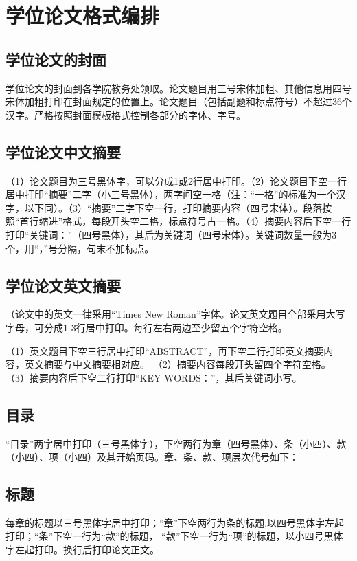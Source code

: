 \documentclass{bucthesis}
\begin{document}
\chapter{学位论文格式编排}
\section{学位论文的封面}{\par
	学位论文的封面到各学院教务处领取。论文题目用三号宋体加粗、其他信息用四号宋体加粗打印在封面规定的位置上。论文题目（包括副题和标点符号）不超过36个汉字。严格按照封面模板格式控制各部分的字体、字号。
\par}
\section{学位论文中文摘要}{\par
	（1）论文题目为三号黑体字，可以分成1或2行居中打印。（2）论文题目下空一行居中打印“摘要”二字（小三号黑体），两字间空一格（注：“一格”的标准为一个汉字，以下同）。（3）“摘要”二字下空一行，打印摘要内容（四号宋体）。段落按照“首行缩进”格式，每段开头空二格，标点符号占一格。（4）摘要内容后下空一行打印“关键词：”（四号黑体），其后为关键词（四号宋体）。关键词数量一般为3个，用“，”号分隔，句末不加标点。
\par}
\section{学位论文英文摘要}{\par
	（论文中的英文一律采用“Times New Roman”字体。论文英文题目全部采用大写字母，可分成1-3行居中打印。每行左右两边至少留五个字符空格。\par
	（1）英文题目下空三行居中打印“ABSTRACT”，再下空二行打印英文摘要内容，英文摘要与中文摘要相对应。
	（2）摘要内容每段开头留四个字符空格。
	（3）摘要内容后下空二行打印“KEY WORDS：”，其后关键词小写。
	\par}
\section{目录}{\par“目录”两字居中打印（三号黑体字），下空两行为章（四号黑体）、条（小四）、款（小四）、项（小四）及其开始页码。章、条、款、项层次代号如下：}
\section{标题}{\par
	每章的标题以三号黑体字居中打印；``章”下空两行为条的标题,以四号黑体字左起打印；``条”下空一行为``款”的标题， ``款”下空一行为``项”的标题，以小四号黑体字左起打印。换行后打印论文正文。\par}
\end{document}
